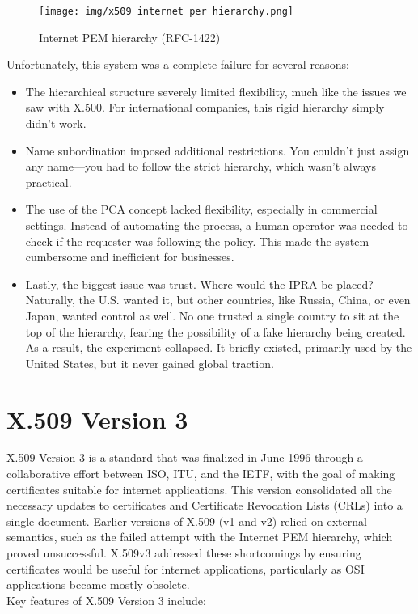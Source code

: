 \begin{figure}[h]
  \centering
  \texttt{[image: img/x509 internet per
  hierarchy.png]}

  \caption{Internet PEM hierarchy (RFC-1422)}
\end{figure}

Unfortunately, this system was a complete failure for several reasons:

\begin{itemize}
  \item The hierarchical structure severely limited flexibility, much
    like the issues we saw with X.500. For international companies,
    this rigid hierarchy simply didn't work.

  \item Name subordination imposed additional restrictions. You
    couldn't just assign any name—you had to follow the strict
    hierarchy, which wasn't always practical.

  \item The use of the PCA concept lacked flexibility, especially in
    commercial settings. Instead of automating the process, a human
    operator was needed to check if the requester was following the
    policy. This made the system cumbersome and inefficient for
    businesses.

  \item Lastly, the biggest issue was trust. Where would the IPRA be
    placed? Naturally, the U.S. wanted it, but other countries, like
    Russia, China, or even Japan, wanted control as well. No one
    trusted a single country to sit at the top of the hierarchy,
    fearing the possibility of a fake hierarchy being created. As a
    result, the experiment collapsed. It briefly existed, primarily
    used by the United States, but it never gained global traction.
\end{itemize}

\section{X.509 Version 3}

X.509 Version 3 is a standard that was finalized in June 1996 through
a collaborative effort between ISO, ITU, and the IETF, with the goal
of making certificates suitable for internet applications. This
version consolidated all the necessary updates to certificates and
Certificate Revocation Lists (CRLs) into a single document. Earlier
versions of X.509 (v1 and v2) relied on external semantics, such as
the failed attempt with the Internet PEM hierarchy, which proved
unsuccessful. X.509v3 addressed these shortcomings by ensuring
certificates would be useful for internet applications, particularly
as OSI applications became mostly obsolete.\\
Key features of X.509 Version 3 include:

